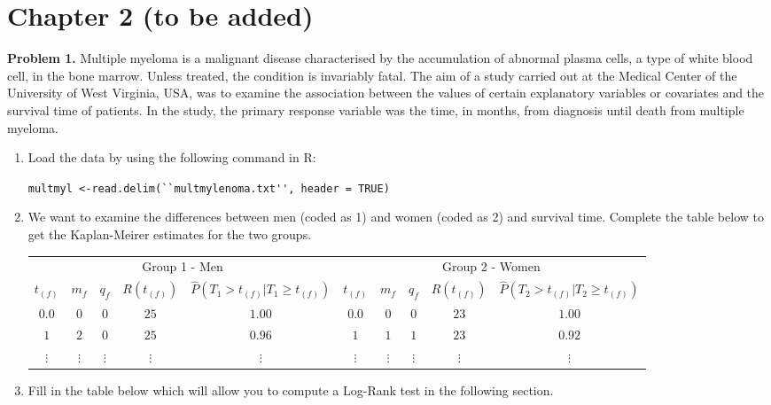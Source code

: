 \documentclass[12pt]{article}
\begin{document}
\section{Chapter 2 (to be added)}

\textbf{Problem 1.} Multiple myeloma is a malignant disease characterised by the accumulation
of abnormal plasma cells, a type of white blood cell, in the bone marrow. Unless
treated, the condition is invariably fatal. The aim of a study carried out at
the Medical Center of the University of West Virginia, USA, was to examine the association between the values of certain explanatory variables or covariates and the survival time of patients. In the study, the primary response
variable was the time, in months, from diagnosis until death from multiple
myeloma.
\begin{enumerate}
\item Load the data by using the following command in R:

\lstinline{multmyl <-read.delim(``multmylenoma.txt'', header = TRUE)}
\item We want to examine the differences between men (coded as 1) and women (coded as 2) and survival time. Complete the table below to get the Kaplan-Meirer estimates for the two groups.

\begin{center}
\begin{tabular}{ c c c c c | c c c c c }
 \multicolumn{5}{c}{Group 1 - Men} & \multicolumn{5}{c}{Group 2 - Women} \\

 $t_{(f)}$ & $m_f$ & $q_{f}$ & $R(t_{(f)})$ & $\hat{P}(T_1>t_{(f)}|T_1 \ge t_{(f)})$   & $t_{(f)}$ & $m_f$ & $q_{f}$ & $R(t_{(f)})$ & $\hat{P}(T_2>t_{(f)}|T_2 \ge t_{(f)})$\\

 \hline

 $0.0$ & $0$ & $0$ & $25$ & $1.00$    & $0.0$ & $0$ & $0$ & $23$ & $1.00$ \\

 $1$ & $2$ & $0$ & $25$ & $0.96$    & $1$ & $1$ & $1$ & $23$ & $0.92$ \\

 $\vdots$ & $\vdots$ & $\vdots$ & $\vdots$ & $\vdots$    & $\vdots$ & $\vdots$ & $\vdots$ & $\vdots$ & $\vdots$
\end{tabular}
\end{center}
\item Fill in the table below which will allow you to compute a Log-Rank test in the following section. 


\end{enumerate}
\end{document}
